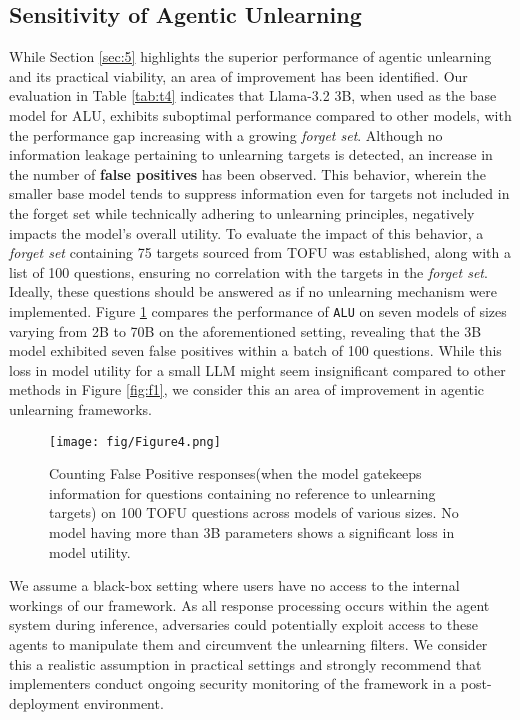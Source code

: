 \subsection{Sensitivity of Agentic Unlearning}
\label{sec:7}
While Section \ref{sec:5} highlights the superior performance of agentic unlearning and its practical viability, an area of improvement has been identified. Our evaluation in Table \ref{tab:t4} indicates that Llama-3.2 3B, when used as the base model for ALU, exhibits suboptimal performance compared to other models, with the performance gap increasing with a growing \emph{forget set}. Although no information leakage pertaining to unlearning targets is detected, an increase in the number of \textbf{false positives} has been observed. This behavior, wherein the smaller base model tends to suppress information even for targets not included in the forget set while technically adhering to unlearning principles, negatively impacts the model's overall utility. To evaluate the impact of this behavior, a \emph{forget set} containing 75 targets sourced from TOFU \cite{maini2024tofu} was established, along with a list of 100 questions, ensuring no correlation with the targets in the \emph{forget set}. Ideally, these questions should be answered as if no unlearning mechanism were implemented. Figure \ref{fig:f3} compares the performance of \texttt{ALU} on seven models of sizes varying from 2B to 70B \cite{gemmateam2024gemma2improvingopen, grattafiori2024llama3herdmodels, almazrouei2023falconseriesopenlanguage, qwen2.5} on the aforementioned setting, revealing that the 3B model exhibited seven false positives within a batch of 100 questions. While this loss in model utility for a small LLM might seem insignificant compared to other methods in Figure \ref{fig:f1}, we consider this an area of improvement in agentic unlearning frameworks. 

\begin{figure}[t]
    \centering
    \texttt{[image: fig/Figure4.png]}
    \caption{Counting False Positive responses(when the model gatekeeps information for questions containing no reference to unlearning targets) on 100 TOFU questions across models of various sizes. No model having more than 3B parameters shows a significant loss in model utility.}
    \label{fig:f3}
\end{figure}

We assume a black-box setting where users have no access to the internal workings of our framework. As all response processing occurs within the agent system during inference, adversaries could potentially exploit access to these agents to manipulate them and circumvent the unlearning filters. We consider this a realistic assumption in practical settings and strongly recommend that implementers conduct ongoing security monitoring of the framework in a post-deployment environment.

